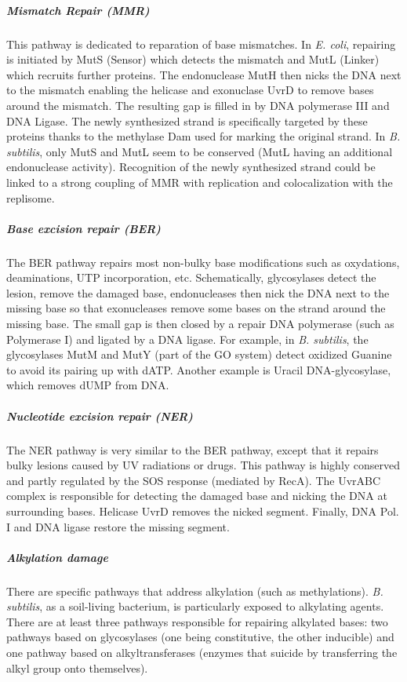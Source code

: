 \subparagraph{Mismatch Repair (MMR)} This pathway is dedicated to reparation of base mismatches. In \textit{E. coli}, repairing is initiated by MutS (Sensor) which detects the mismatch and MutL (Linker) which recruits further proteins. The endonuclease MutH then nicks the DNA next to the mismatch enabling the helicase and exonuclase UvrD to remove bases around the mismatch. The resulting gap is filled in by DNA polymerase III and DNA Ligase. The newly synthesized strand is specifically targeted by these proteins thanks to the methylase Dam used for marking the original strand. In \textit{B. subtilis}, only MutS and MutL seem to be conserved (MutL having an additional endonuclease activity). Recognition of the newly synthesized strand could be linked to a strong coupling of MMR with replication and colocalization with the replisome.

\subparagraph{Base excision repair (BER)} The BER pathway repairs most non-bulky base modifications such as oxydations, deaminations, UTP incorporation, etc. Schematically, glycosylases detect the lesion, remove the damaged base, endonucleases then nick the DNA next to the missing base so that exonucleases remove some bases on the strand around the missing base. The small gap is then closed by a repair DNA polymerase (such as Polymerase I) and ligated by a DNA ligase. For example, in \textit{B. subtilis}, the glycosylases MutM and MutY (part of the GO system) detect oxidized Guanine to avoid its pairing up with dATP. Another example is Uracil DNA-glycosylase, which removes dUMP from DNA. 

\subparagraph{Nucleotide excision repair (NER)} The NER pathway is very similar to the BER pathway, except that it repairs bulky lesions caused by UV radiations or drugs. This pathway is highly conserved and partly regulated by the SOS response (mediated by RecA). The UvrABC complex is responsible for detecting the damaged base and nicking the DNA at surrounding bases. Helicase UvrD removes the nicked segment. Finally, DNA Pol. I and DNA ligase restore the missing segment.

\subparagraph{Alkylation damage} There are specific pathways that address alkylation (such as methylations). \textit{B. subtilis}, as a soil-living bacterium, is particularly exposed to alkylating agents. There are at least three pathways responsible for repairing alkylated bases: two pathways based on glycosylases (one being constitutive, the other inducible) and one pathway based on alkyltransferases (enzymes that suicide by transferring the alkyl group onto themselves).

